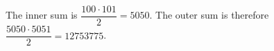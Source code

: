 The inner sum is $\dfrac{100\cdot101}{2}=5050$. The outer sum is therefore $\dfrac{5050\cdot5051}{2}=\boxed{12753775}$.
